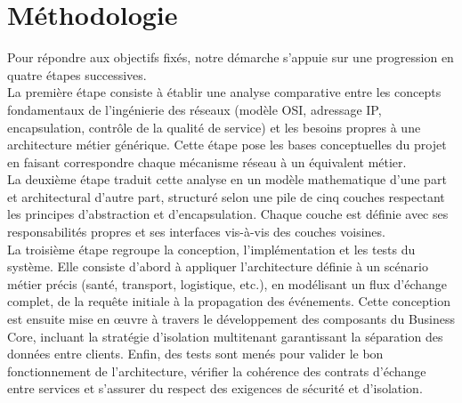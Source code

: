\section{Méthodologie}

Pour répondre aux objectifs fixés, notre démarche s'appuie sur une progression en quatre étapes successives.\\

La première étape consiste à établir une analyse comparative entre les concepts fondamentaux de l'ingénierie des réseaux (modèle OSI, adressage IP, encapsulation, contrôle de la qualité de service) et les besoins propres à une architecture métier générique. Cette étape pose les bases conceptuelles du projet en faisant correspondre chaque mécanisme réseau à un équivalent métier.\\

La deuxième étape traduit cette analyse en un modèle mathematique d'une part et architectural d'autre part, structuré selon une pile de cinq couches respectant les principes d'abstraction et d'encapsulation. Chaque couche est définie avec ses responsabilités propres et ses interfaces vis-à-vis des couches voisines.\\
       
La troisième étape regroupe la conception, l'implémentation et les tests du système. Elle consiste d'abord à appliquer l'architecture définie à un scénario métier précis (santé, transport, logistique, etc.), en modélisant un flux d'échange complet, de la requête initiale à la propagation des événements. Cette conception est ensuite mise en œuvre à travers le développement des composants du Business Core, incluant la stratégie d'isolation multitenant garantissant la séparation des données entre clients. Enfin, des tests sont menés pour valider le bon fonctionnement de l'architecture, vérifier la cohérence des contrats d'échange entre services et s'assurer du respect des exigences de sécurité et d'isolation.\\

